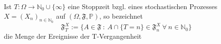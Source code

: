 \label{T-Vergangenheit}
Ist $T: \Omega \to \mathbb{N}_{0} \cup \lbrace \infty \rbrace$ eine Stoppzeit bzgl. eines stochastischen Prozesses $X = (X_{n})_{n \in \mathbb{N}_{0}}$ auf $(\Omega, \mathfrak{F}, \mathbb{P})$, so bezeichnet
\begin{equation*}
\mathfrak{F}_{T}^{X} := \lbrace A \in \mathfrak{F} \: : \: A \cap \lbrace T = n \rbrace \in \mathfrak{F}_{n}^{X} \: \forall \: n \in \mathbb{N}_{0} \rbrace
\end{equation*}
die Menge der Ereignisse der T-Vergangenheit